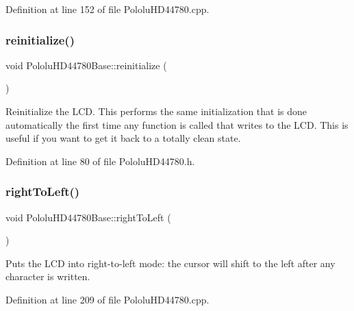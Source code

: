 Definition at line 152 of file Pololu\+H\+D44780.\+cpp.

\mbox{\label{class_pololu_h_d44780_base_a10c1c42406708172fc38b718790ba881}} 
\subsubsection{\texorpdfstring{reinitialize()}{reinitialize()}}
{\footnotesize\ttfamily void Pololu\+H\+D44780\+Base\+::reinitialize (\begin{DoxyParamCaption}{ }\end{DoxyParamCaption})\hspace{0.3cm}{\ttfamily [inline]}}

Reinitialize the L\+CD. This performs the same initialization that is done automatically the first time any function is called that writes to the L\+CD. This is useful if you want to get it back to a totally clean state. 

Definition at line 80 of file Pololu\+H\+D44780.\+h.

\mbox{\label{class_pololu_h_d44780_base_aa3f8d4ba18feb9aa0f0a2fef3c6c2b37}} 
\subsubsection{\texorpdfstring{right\+To\+Left()}{rightToLeft()}}
{\footnotesize\ttfamily void Pololu\+H\+D44780\+Base\+::right\+To\+Left (\begin{DoxyParamCaption}{ }\end{DoxyParamCaption})}

Puts the L\+CD into right-\/to-\/left mode\+: the cursor will shift to the left after any character is written. 

Definition at line 209 of file Pololu\+H\+D44780.\+cpp.

\mbox{\label{class_pololu_h_d44780_base_aada34a47663585f60b70e1d6f936f6d3}} 
